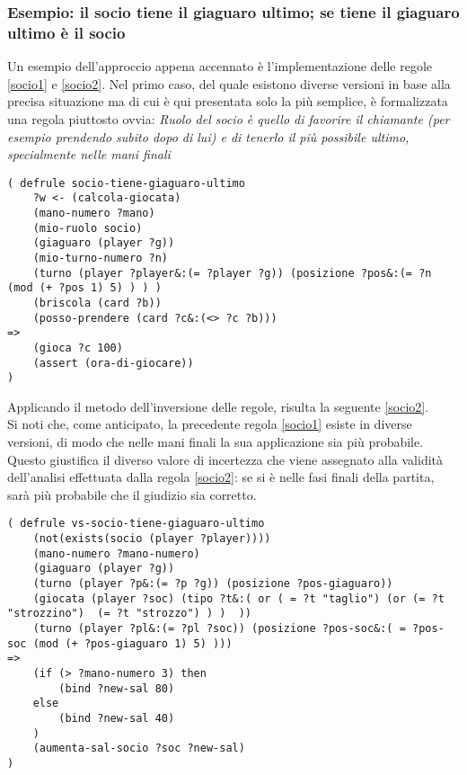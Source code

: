 \subsubsection*{Esempio: il socio tiene il giaguaro ultimo; se tiene il giaguaro ultimo è il socio}
Un esempio dell'approccio appena accennato è l'implementazione delle regole \ref{socio1} e \ref{socio2}.
Nel primo caso, del quale esistono diverse versioni in base alla precisa situazione ma di cui è qui presentata solo la più semplice, è formalizzata una regola piuttosto ovvia:
\emph{Ruolo del socio è quello di favorire il chiamante (per esempio prendendo subito dopo di lui) e di tenerlo il più possibile ultimo, specialmente nelle mani finali}

\begin{lstlisting}[caption={Se sono il socio e gioco subito dopo di lui, prendo per lasciarlo ultimo la mano successiva},label=socio1]
( defrule socio-tiene-giaguaro-ultimo
    ?w <- (calcola-giocata)
    (mano-numero ?mano)
    (mio-ruolo socio)
    (giaguaro (player ?g))
    (mio-turno-numero ?n)
    (turno (player ?player&:(= ?player ?g)) (posizione ?pos&:(= ?n (mod (+ ?pos 1) 5) ) ) )
    (briscola (card ?b))
    (posso-prendere (card ?c&:(<> ?c ?b)))
=>
    (gioca ?c 100)
    (assert (ora-di-giocare))
)
\end{lstlisting}

Applicando il metodo dell'inversione delle regole, risulta la seguente \ref{socio2}.\\
Si noti che, come anticipato, la precedente regola \ref{socio1} esiste in diverse versioni, di modo che nelle mani finali la sua applicazione sia più probabile. Questo giustifica il diverso valore di incertezza che viene assegnato alla validità dell'analisi effettuata dalla regola \ref{socio2}: se si è nelle fasi finali della partita, sarà più probabile che il giudizio sia corretto.



\begin{lstlisting}[caption={Se qualcuno prende lasciando il giaguaro ultimo nella mano successiva, probabilmente è il socio, soprattutto se siamo durante la fase finale della partita},label=socio2]
( defrule vs-socio-tiene-giaguaro-ultimo
    (not(exists(socio (player ?player))))
    (mano-numero ?mano-numero)
    (giaguaro (player ?g))
    (turno (player ?p&:(= ?p ?g)) (posizione ?pos-giaguaro))
    (giocata (player ?soc) (tipo ?t&:( or ( = ?t "taglio") (or (= ?t "strozzino")  (= ?t "strozzo") ) )  ))
    (turno (player ?pl&:(= ?pl ?soc)) (posizione ?pos-soc&:( = ?pos-soc (mod (+ ?pos-giaguaro 1) 5) )))
=>
    (if (> ?mano-numero 3) then
        (bind ?new-sal 80)
    else
        (bind ?new-sal 40)
    )
    (aumenta-sal-socio ?soc ?new-sal)
)
\end{lstlisting}

